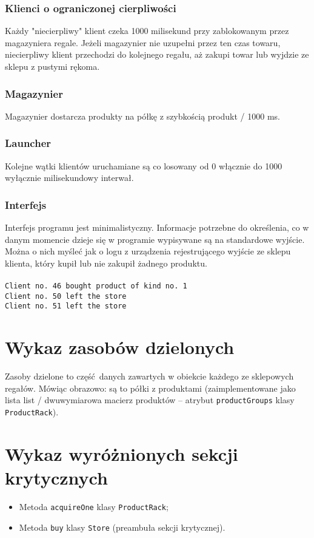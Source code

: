 \documentclass[titlepage]{article}
\begin{document}
\subsubsection{Klienci o ograniczonej cierpliwości}
Każdy "niecierpliwy" klient czeka 1000 milisekund przy zablokowanym przez magazyniera regale.
Jeżeli magazynier nie uzupełni przez ten czas towaru, niecierpliwy klient przechodzi do kolejnego regału, aż zakupi towar lub wyjdzie ze sklepu z pustymi rękoma.

\subsubsection{Magazynier}
Magazynier dostarcza produkty na półkę z szybkością produkt / 1000 ms.

\subsubsection{Launcher}
Kolejne wątki klientów uruchamiane są co losowany od 0 włącznie do 1000 wyłącznie milisekundowy interwał.

\subsubsection{Interfejs}
Interfejs programu jest minimalistyczny.
Informacje potrzebne do określenia, co w danym momencie dzieje się w programie wypisywane są na standardowe wyjście.
Można o nich myśleć jak o logu z urządzenia rejestrującego wyjście ze sklepu klienta, który kupił lub nie zakupił żadnego produktu.
\\
\\
\texttt{Client no. 46 bought product of kind no. 1}
\\
\texttt{Client no. 50 left the store}
\\
\texttt{Client no. 51 left the store}

\section{Wykaz zasobów dzielonych}
Zasoby dzielone to część danych zawartych w obiekcie każdego ze sklepowych regałów.
Mówiąc obrazowo: są to półki z produktami (zaimplementowane jako lista list / dwuwymiarowa macierz produktów -- atrybut \texttt{productGroups} klasy \texttt{ProductRack}).

\section{Wykaz wyróżnionych sekcji krytycznych}
\begin{itemize}
	\item Metoda \texttt{acquireOne} klasy \texttt{ProductRack};
	\item Metoda \texttt{buy} klasy \texttt{Store} (preambuła sekcji krytycznej).
\end{itemize}
\end{document}
